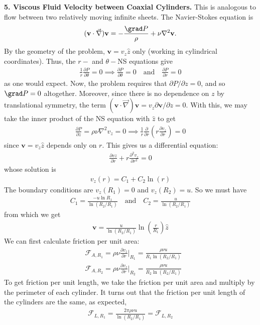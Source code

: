 \documentclass{article}
\theoremstyle{definition}
\newcommand{\p}{\partial}
\newcommand{\f}[2]{\frac{#1}{#2}}
\newcommand{\lp}{\left(}
\newcommand{\rp}{\right)}
\begin{document}
\noindent \textbf{5. Viscous Fluid Velocity between Coaxial Cylinders.}  This is analogous to flow between two relatively moving infinite sheets. The Navier-Stokes equation is 
\begin{align*}
(\mathbf{v}\cdot \vec{\nabla} ) \mathbf{v} = -\f{\grad P}{\rho} + \nu \nabla^2 \mathbf{v}.
\end{align*}
By the geometry of the problem, $\mathbf{v} = v_z \hat{z}$ only (working in cylindrical coordinates). Thus, the $r-$ and $\theta-$NS equations give 
\begin{align*}
\f{1}{r}\f{\p P}{\p \theta} = 0 \implies \f{\p P}{\p \theta} = 0
\quad \text{and} \quad
\f{\p P}{\p r} = 0
\end{align*}
as one would expect. Now, the problem requires that $\p P / \p z = 0$, and so $\grad P = 0$ altogether. Moreover, since there is no dependence on $z$ by translational symmetry, the term $(\mathbf{v} \cdot \vec{\nabla} )\mathbf{v} = v_z \p \mathbf{v}/\p z = 0$.  With this, we may take the inner product of the NS equation with $\hat{z}$ to get
\begin{align*}
\f{\p P}{\p z} = \rho \nu \nabla^2 v_z = 0\implies  \f{1}{r} \f{\p}{\p r}\lp  r \f{\p v_z}{\p r}\rp = 0  
\end{align*}
since $\mathbf{v} = v_z \hat{z}$ depends only on $r$. This gives us a differential equation:
\begin{align*}
\f{\p vz}{\p r} + r \f{\p^2 v_z}{\p r^2} = 0
\end{align*}
whose solution is 
\begin{align*}
{v_z(r) = C_1 + C_2 \ln (r)}
\end{align*}
The boundary conditions are $v_z(R_1) = 0$ and $v_z(R_2) = u$. So we must have
\begin{align*}
C_1 = \f{-u \ln R_1}{\ln(R_2/R_1)} \quad \text{and} \quad C_2 = \f{u}{\ln(R_2/R_1)}
\end{align*}
from which we get
\begin{align*}
\boxed{\mathbf{v} = \f{u}{\ln(R_2/R_1)} \ln\lp \f{r}{R_1}\rp\hat{z}}
\end{align*}
We can first calculate friction per unit area:
\begin{align*}
&\mathcal{F}_{A,R_1} = \rho \nu \f{\p v_z}{\p r}\bigg\vert_{R_1} =   \f{ \rho \nu u}{R_1 \ln (R_2/R_1)}\\
&\mathcal{F}_{A,R_2} = \rho \nu \f{\p v_z}{\p r}\bigg\vert_{R_2} =   \f{ \rho \nu u}{R_2 \ln (R_2/R_1)}
\end{align*}
To get friction per unit length, we take the friction per unit area and multiply by the perimeter of each cylinder. It turns out that the friction per unit length of the cylinders are the same, as expected,
\begin{align*}
\mathcal{F}_{L,R_1} = \boxed{\f{2\pi \rho \nu u}{\ln(R_2/R_1)}} = \mathcal{F}_{L,R_2}
\end{align*}
\end{document}
